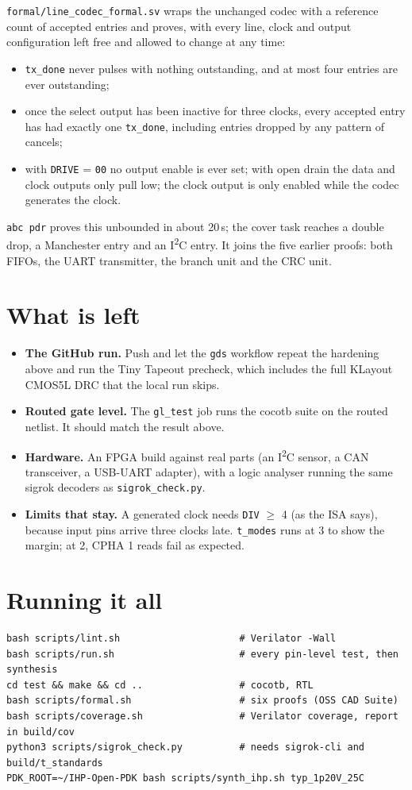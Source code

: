 \documentclass[11pt,a4paper]{article}
\newcommand{\sig}[1]{\texttt{#1}}
\begin{document}
\sig{formal/line\_codec\_formal.sv} wraps the unchanged codec with a reference count of accepted entries and proves, with every line, clock and output configuration left free and allowed to change at any time:
\begin{itemize}
\item \sig{tx\_done} never pulses with nothing outstanding, and at most four entries are ever outstanding;
\item once the select output has been inactive for three clocks, every accepted entry has had exactly one \sig{tx\_done}, including entries dropped by any pattern of cancels;
\item with \sig{DRIVE} = \texttt{00} no output enable is ever set; with open drain the data and clock outputs only pull low; the clock output is only enabled while the codec generates the clock.
\end{itemize}
\sig{abc pdr} proves this unbounded in about 20\,s; the cover task reaches a double drop, a Manchester entry and an I\textsuperscript{2}C entry. It joins the five earlier proofs: both FIFOs, the UART transmitter, the branch unit and the CRC unit.

\section{What is left}

\begin{itemize}
\item \textbf{The GitHub run.} Push and let the \sig{gds} workflow repeat the hardening above and run the Tiny Tapeout precheck, which includes the full KLayout CMOS5L DRC that the local run skips.
\item \textbf{Routed gate level.} The \sig{gl\_test} job runs the cocotb suite on the routed netlist. It should match the result above.
\item \textbf{Hardware.} An FPGA build against real parts (an I\textsuperscript{2}C sensor, a CAN transceiver, a USB-UART adapter), with a logic analyser running the same sigrok decoders as \sig{sigrok\_check.py}.
\item \textbf{Limits that stay.} A generated clock needs \sig{DIV} $\ge$ 4 (as the ISA says), because input pins arrive three clocks late. \sig{t\_modes} runs at 3 to show the margin; at 2, CPHA 1 reads fail as expected.
\end{itemize}

\section{Running it all}

\begin{lstlisting}
bash scripts/lint.sh                     # Verilator -Wall
bash scripts/run.sh                      # every pin-level test, then synthesis
cd test && make && cd ..                 # cocotb, RTL
bash scripts/formal.sh                   # six proofs (OSS CAD Suite)
bash scripts/coverage.sh                 # Verilator coverage, report in build/cov
python3 scripts/sigrok_check.py          # needs sigrok-cli and build/t_standards
PDK_ROOT=~/IHP-Open-PDK bash scripts/synth_ihp.sh typ_1p20V_25C
\end{lstlisting}
\end{document}
